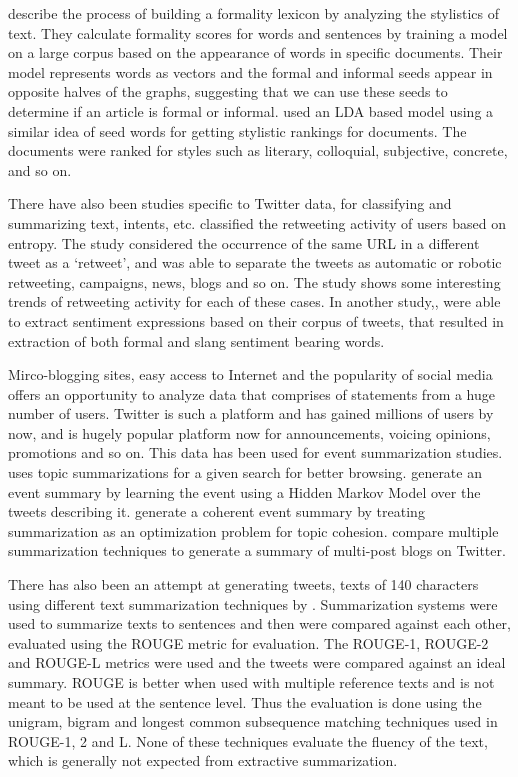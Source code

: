 \documentclass[11pt]{article}
\begin{document}
 describe the process of building a formality lexicon by analyzing the stylistics of text. They calculate formality scores for words and sentences by training a model on a large corpus based on the appearance of words in specific documents. Their model represents words as vectors and the formal and informal seeds appear in opposite halves of the graphs, suggesting that we can use these seeds to determine if an article is formal or informal.  used an LDA based model using a similar idea of seed words for getting stylistic rankings for documents. The documents were ranked for styles such as literary, colloquial, subjective, concrete, and so on. 

There have also been studies specific to Twitter data, for classifying and summarizing text, intents, etc.  classified the retweeting activity of users based on entropy. The study considered the occurrence of the same URL in a different tweet as a ‘retweet’, and was able to separate the tweets as automatic or robotic retweeting, campaigns, news, blogs and so on. The study shows some interesting trends of retweeting activity for each of these cases. In another study,, were able to extract sentiment expressions based on their corpus of tweets, that resulted in extraction of both formal and slang sentiment bearing words.

Mirco-blogging sites, easy access to Internet and the popularity of social media offers an opportunity to analyze data that comprises of statements from a huge number of users. Twitter is such a platform and has gained millions of users by now, and is hugely popular platform now for announcements, voicing opinions, promotions and so on. This data has been used for event summarization studies.  uses topic summarizations for a given search for better browsing.  generate an event summary by learning the event using a Hidden Markov Model over the tweets describing it.  generate a coherent event summary by treating summarization as an optimization problem for topic cohesion.  compare multiple summarization techniques to generate a summary of multi-post blogs on Twitter.

There has also been an attempt at generating tweets, texts of 140 characters using different text summarization techniques by  . Summarization systems were used to summarize texts to sentences and then were compared against each other, evaluated using the ROUGE metric for evaluation. The ROUGE-1, ROUGE-2 and ROUGE-L metrics were used and the tweets were compared against an ideal summary. ROUGE is better when used with multiple reference texts and is not meant to be used at the sentence level. Thus the evaluation is done using the unigram, bigram and longest common subsequence matching techniques used in ROUGE-1, 2 and L. None of these techniques evaluate the fluency of the text, which is generally not expected from extractive summarization. 
\end{document}
